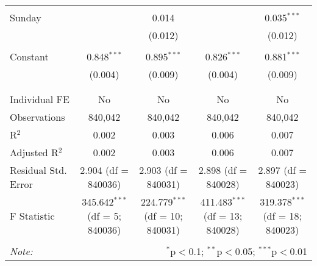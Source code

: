 \documentclass[
]{article}
\begin{document}
\begin{table}[!htbp]
{\begin{tabular}{@{\extracolsep{5pt}}lcccc}
  & & & & \\ 
 Sunday &  & 0.014 &  & 0.035$^{***}$ \\ 
  &  & (0.012) &  & (0.012) \\ 
  & & & & \\ 
 Constant & 0.848$^{***}$ & 0.895$^{***}$ & 0.826$^{***}$ & 0.881$^{***}$ \\ 
  & (0.004) & (0.009) & (0.004) & (0.009) \\ 
  & & & & \\ 
\hline \\[-1.8ex] 
Individual FE & No & No & No & No \\ 
Observations & 840,042 & 840,042 & 840,042 & 840,042 \\ 
R$^{2}$ & 0.002 & 0.003 & 0.006 & 0.007 \\ 
Adjusted R$^{2}$ & 0.002 & 0.003 & 0.006 & 0.007 \\ 
Residual Std. Error & 2.904 (df = 840036) & 2.903 (df = 840031) & 2.898 (df = 840028) & 2.897 (df = 840023) \\ 
F Statistic & 345.642$^{***}$ (df = 5; 840036) & 224.779$^{***}$ (df = 10; 840031) & 411.483$^{***}$ (df = 13; 840028) & 319.378$^{***}$ (df = 18; 840023) \\ 
\hline 
\hline \\[-1.8ex] 
\textit{Note:}  & \multicolumn{4}{r}{$^{*}$p$<$0.1; $^{**}$p$<$0.05; $^{***}$p$<$0.01} \\ 
\end{tabular}
} 
\end{table} 
\newpage
\end{document}
